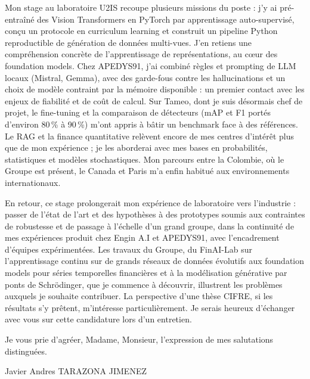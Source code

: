 \documentclass[a4paper,11pt]{article}
\begin{document}
Mon stage au laboratoire U2IS recoupe plusieurs missions du poste : j'y ai pré-entraîné des Vision Transformers en PyTorch par apprentissage auto-supervisé, conçu un protocole en curriculum learning et construit un pipeline Python reproductible de génération de données multi-vues. J'en retiens une compréhension concrète de l'apprentissage de représentations, au cœur des foundation models. Chez APEDYS91, j'ai combiné règles et prompting de LLM locaux (Mistral, Gemma), avec des garde-fous contre les hallucinations et un choix de modèle contraint par la mémoire disponible : un premier contact avec les enjeux de fiabilité et de coût de calcul. Sur Tameo, dont je suis désormais chef de projet, le fine-tuning et la comparaison de détecteurs (mAP et F1 portés d'environ 80\,\% à 90\,\%) m'ont appris à bâtir un benchmark face à des références. Le RAG et la finance quantitative relèvent encore de mes centres d'intérêt plus que de mon expérience ; je les aborderai avec mes bases en probabilités, statistiques et modèles stochastiques. Mon parcours entre la Colombie, où le Groupe est présent, le Canada et Paris m'a enfin habitué aux environnements internationaux.

En retour, ce stage prolongerait mon expérience de laboratoire vers l'industrie : passer de l'état de l'art et des hypothèses à des prototypes soumis aux contraintes de robustesse et de passage à l'échelle d'un grand groupe, dans la continuité de mes expériences produit chez Engin A.I et APEDYS91, avec l'encadrement d'équipes expérimentées. Les travaux du Groupe, du FinAI-Lab sur l'apprentissage continu sur de grands réseaux de données évolutifs aux foundation models pour séries temporelles financières et à la modélisation générative par ponts de Schrödinger, que je commence à découvrir, illustrent les problèmes auxquels je souhaite contribuer. La perspective d'une thèse CIFRE, si les résultats s'y prêtent, m'intéresse particulièrement. Je serais heureux d'échanger avec vous sur cette candidature lors d'un entretien.

Je vous prie d'agréer, Madame, Monsieur, l'expression de mes salutations distinguées.

\hfill Javier Andres TARAZONA JIMENEZ
\end{document}
